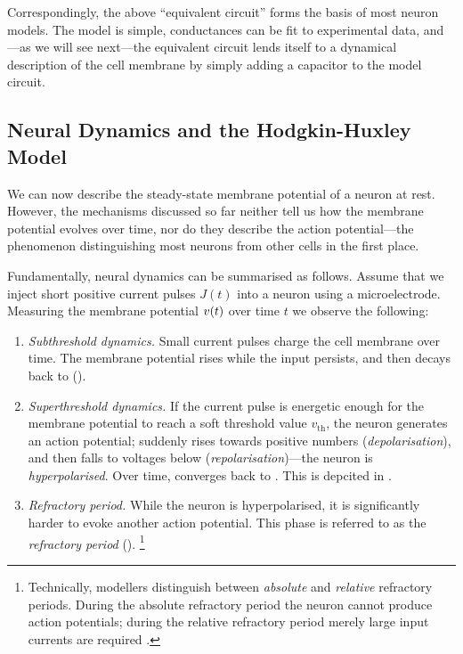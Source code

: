 Correspondingly, the above \enquote{equivalent circuit} forms the basis of most neuron models.
The model is simple, conductances can be fit to experimental data, and---as we will see next---the equivalent circuit lends itself to a dynamical description of the cell membrane by simply adding a capacitor to the model circuit.

\pagebreak

\subsection{Neural Dynamics and the Hodgkin-Huxley Model}
\label{sec:neural_dynamics}

We can now describe the steady-state membrane potential of a neuron at rest.
However, the mechanisms discussed so far neither tell us how the membrane potential evolves over time, nor do they describe the action potential---the phenomenon distinguishing most neurons from other cells in the first place.

Fundamentally, neural dynamics can be summarised as follows.
Assume that we inject short positive current pulses $J(t)$ into a neuron using a microelectrode.
Measuring the membrane potential ${v}(t)$ over time $t$ we observe the following:
\begin{enumerate}[1.]
	\setlength{\itemsep}{0.25em}
	\vspace*{-0.25em}
	\item \emph{Subthreshold dynamics.} Small current pulses charge the cell membrane over time. The membrane potential \vMem rises while the input persists, and then decays back to \vRest ().
	\item \emph{Superthreshold dynamics.} If the current pulse is energetic enough for the membrane potential to reach a soft threshold value $v_\mathrm{th}$, the neuron generates an action potential; \vMem suddenly rises towards positive numbers (\emph{depolarisation}), and then falls to voltages below \vRest (\emph{repolarisation})---the neuron is \emph{hyperpolarised}. Over time, \vMem converges back to  \vRest.  This is depcited in .
	\item \emph{Refractory period.} While the neuron is hyperpolarised, it is significantly harder to evoke another action potential. This phase is referred to as the \emph{refractory period} ().%
	\footnote{Technically, modellers distinguish between \emph{absolute} and \emph{relative} refractory periods. During the absolute refractory period the neuron cannot produce action potentials; during the relative refractory period merely large input currents are required \citep[Section~2.3.2]{izhikevich2007dynamical}.}
\end{enumerate}

